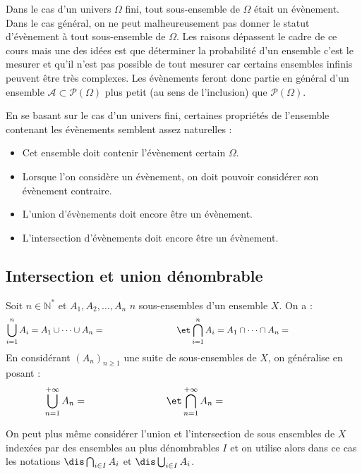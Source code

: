 \documentclass[a4paper,10pt]{report}
\begin{document}
\medskip

\noindent Dans le cas d'un univers $\Omega$ fini, tout sous-ensemble de $\Omega$ était un évènement. Dans le cas général, on ne peut malheureusement pas donner le statut d'évènement à tout sous-ensemble de $\Omega$. Les raisons dépassent le cadre de ce cours mais une des idées est que déterminer la probabilité d'un ensemble c'est le mesurer et qu'il n'est pas possible de \og tout mesurer \fg car certains ensembles infinis peuvent être très complexes. Les évènements feront donc partie en général d'un ensemble $\mathcal{A} \subset \mathcal{P}(\Omega)$ plus petit (au sens de l'inclusion) que $\mathcal{P}(\Omega)$.

\medskip

\noindent En se basant sur le cas d'un univers fini, certaines propriétés de l'ensemble contenant les évènements semblent assez \og naturelles \fg :

\vspace{0.2cm}

\begin{itemize}
\item Cet ensemble doit contenir l'évènement certain $\Omega$.
\item Lorsque l'on considère un évènement, on doit pouvoir considérer son évènement contraire.
\item L'union d'évènements doit encore être un évènement.
\item L'intersection d'évènements doit encore être un évènement.
\end{itemize}

\subsection{Intersection et union dénombrable}

\noindent Soit $n \in \mathbb{N}^*$ et $A_1, A_2, \ldots, A_n$ $n$ sous-ensembles d'un ensemble $X$. On a :
$$ \bigcup_{i=1}^n A_i = A_1 \cup \cdots \cup A_n =  \qquad \qquad \qquad \qquad \et \bigcap_{i=1}^n A_i = A_1 \cap \cdots \cap A_n =\qquad \qquad \qquad \qquad$$
En considérant $(A_n)_{n \geq 1}$ une suite de sous-ensembles de $X$, on généralise en posant :
$$ \bigcup_{n=1}^{+ \infty} A_n =  \qquad \qquad \qquad \qquad \et \bigcap_{n=1}^{+ \infty} A_n  =\qquad \qquad \qquad  \qquad\qquad$$

\noindent On peut plus même considérer l'union et l'intersection de sous ensembles de $X$ indexées par des ensembles au plus dénombrables $I$ et on utilise alors dans ce cas les notations $\dis \bigcap_{i \in I} A_i$ et $\dis \bigcup_{i \in I} A_i$.
\end{document}
